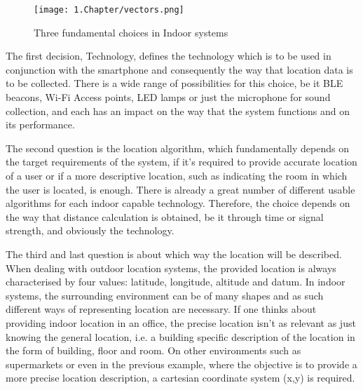 \begin{figure}[htp] 
\centering 
\texttt{[image: 1.Chapter/vectors.png]} 
\caption[Three fundamental choices in Indoor systems]{Three fundamental choices in Indoor systems} 
\label{fig:choices} 
\end{figure} 

The first decision, Technology, defines the technology which is to be used in conjunction with the smartphone and consequently the way that location data is to be collected. There is a wide range of possibilities for this choice, be it BLE beacons, Wi-Fi Access points, LED lamps or just the microphone for sound collection, and each has an impact on the way that the system functions and on its performance.  
 
 
The second question is the location algorithm, which fundamentally depends on the target requirements of the system, if it's required to provide accurate location of a user or if a more descriptive location, such as indicating the room in which the user is located, is enough. There is already a great number of different usable algorithms for each indoor capable technology. Therefore, the choice depends on the way that distance calculation is obtained, be it through time or signal strength, and obviously the technology. 
 
 
The third and last question is about which way the location will be described. When dealing with outdoor location systems, the provided location is always characterised by four values: latitude, longitude, altitude and datum. In indoor systems, the surrounding environment can be of many shapes and as such different ways of representing location are necessary. If one thinks about providing indoor location in an office, the precise location isn't as relevant as just knowing the general location, i.e. a building specific description of the location in the form of building, floor and room. On other environments such as supermarkets or even in the previous example, where the objective is to provide a more precise location description, a cartesian coordinate system (x,y) is required. 
 